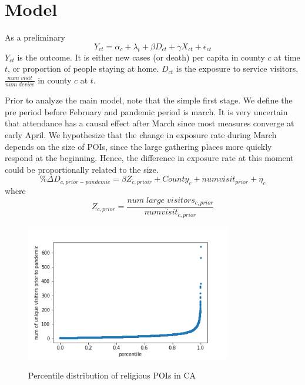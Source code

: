 \documentclass[12pt,english]{article}
\begin{document}
	\section{Model}
	As a preliminary
	\[
	Y_{ct} = \alpha_c+\lambda_t + \beta D_{ct} + \gamma X_{ct} + \epsilon_{ct} 
	\]
	$Y_{ct}$ is the outcome. It is either new cases (or death) per capita in county $c$ at time $t$, or proportion of people staying at home. $D_{ct}$ is the exposure to service visitors, $\frac{num\;visit}{num\;device}$ in county $c$ at $t$. 
	
	Prior to analyze the main model, note that the simple first stage. We define the pre period before February and pandemic period is march. It is very uncertain that attendance has a causal effect after March since most measures converge at early April. We hypothesize that the change in exposure rate during March depends on the size of POIs, since the large gathering places more quickly respond at the beginning. Hence, the difference in exposure rate at this moment could be proportionally related to the size.    
	\[
	\%\Delta D_{c,prior - pandemic} = \beta Z_{c,prioir} + County_c + num visit_{prior}+ \eta_{c}
	\]
	where
	\[
	Z_{c, prior} = \frac{num\;large\;visitors_{c,prior}}{numvisit_{c,prior}}
	\]
	
	
	\begin{figure}[h]
		\centering
		\caption{\small Percentile distribution of religious POIs in CA}
		\includegraphics[width=0.8\textwidth, center]{./figures/1.percentile.png}
		\captionsetup{width=1.0\textwidth}
		\label{figure1}
	\end{figure}
	
\end{document}
